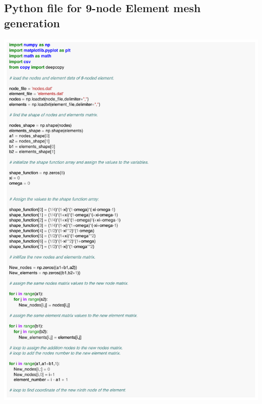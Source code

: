 \documentclass[12pt]{article}
\begin{document}
\begin{appendices}
\section{Python file for 9-node Element mesh generation}
\includegraphics[scale=0.80,page=1]{9Node_Mesh_generation.pdf}
\\
\\

\end{appendices}
\end{document}
